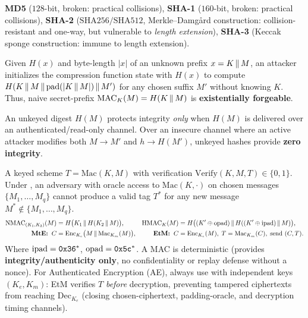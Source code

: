 \begin{compactitem}
  \item {} \textbf{MD5} ($128$-bit, broken: practical collisions), \textbf{SHA-1} ($160$-bit, broken: practical collisions), \textbf{SHA-2} ($\mathrm{SHA256}/\mathrm{SHA512}$, Merkle--Damg\aa rd construction: collision-resistant and one-way, but vulnerable to \emph{length extension}), \textbf{SHA-3} (Keccak sponge construction: immune to length extension).
  \item {} Given $H(x)$ and byte-length $|x|$ of an unknown prefix $x = K \,\|\, M$, an attacker initializes the compression function state with $H(x)$ to compute $H(K \,\|\, M \,\|\, \mathrm{pad}(|K \,\|\, M|) \,\|\, M')$ for any chosen suffix $M'$ without knowing $K$. Thus, naive secret-prefix $\mathrm{MAC}_K(M) = H(K \,\|\, M)$ is \textbf{existentially forgeable}.
  \item {} An unkeyed digest $H(M)$ protects integrity \emph{only} when $H(M)$ is delivered over an authenticated/read-only channel. Over an insecure channel where an active attacker modifies both $M \to M'$ and $h \to H(M')$, unkeyed hashes provide \textbf{zero integrity}.
  \item {} A keyed scheme $T = \mathrm{Mac}(K, M)$ with verification $\mathrm{Verify}(K, M, T) \in \{0,1\}$. Under , an adversary with oracle access to $\mathrm{Mac}(K, \cdot)$ on chosen messages $\{M_1, \dots, M_q\}$ cannot produce a valid tag $T^*$ for any new message $M^* \notin \{M_1, \dots, M_q\}$.
  \begin{align*}
    \mathrm{NMAC}_{(K_1, K_2)}(M) &= H\big(K_1 \,\|\, H(K_2 \,\|\, M)\big), &
    \mathrm{HMAC}_K(M) &= H\big((K' \oplus \mathrm{opad}) \,\|\, H((K' \oplus \mathrm{ipad}) \,\|\, M)\big), \\
    \textbf{MtE:} \;\; C &= \mathrm{Enc}_{K_e}\big(M \,\|\, \mathrm{Mac}_{K_m}(M)\big), &
    \textbf{EtM:} \;\; C &= \mathrm{Enc}_{K_e}(M), \; T = \mathrm{Mac}_{K_m}(C), \; \text{send } (C, T).
  \end{align*}
  Where $\mathrm{ipad}=\texttt{0x36}^*$, $\mathrm{opad}=\texttt{0x5c}^*$. A MAC is deterministic (provides \textbf{integrity/authenticity only}, no confidentiality or replay defense without a nonce). For Authenticated Encryption (AE), always use  with independent keys $(K_e, K_m)$: EtM verifies $T$ \emph{before} decryption, preventing tampered ciphertexts from reaching $\mathrm{Dec}_{K_e}$ (closing chosen-ciphertext, padding-oracle, and decryption timing channels).
\end{compactitem}


